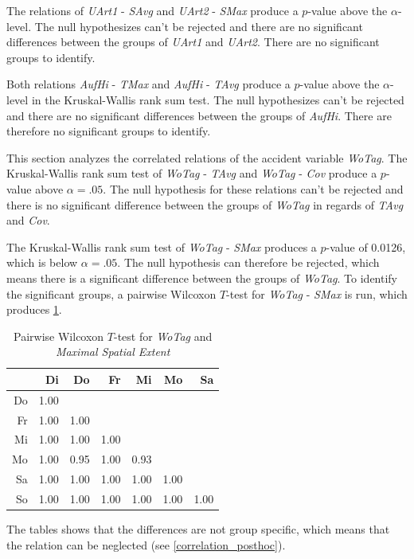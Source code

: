 The relations of \textit{UArt1} - \textit{SAvg} and \textit{UArt2} - \textit{SMax} produce a $p$-value above the $\alpha$-level. The null hypothesizes can't be rejected and there are no significant differences between the groups of \textit{UArt1} and \textit{UArt2}. There are no significant groups to identify.

Both relations \textit{AufHi} - \textit{TMax} and \textit{AufHi} - \textit{TAvg} produce a $p$-value above the $\alpha$-level in the Kruskal-Wallis rank sum test. The null hypothesizes can't be rejected and there are no significant differences between the groups of \textit{AufHi}. There are therefore no significant groups to identify.

This section analyzes the correlated relations of the accident variable \textit{WoTag}. The Kruskal-Wallis rank sum test of \textit{WoTag} - \textit{TAvg} and \textit{WoTag} - \textit{Cov} produce a $p$-value above $\alpha=.05$. The null hypothesis for these relations can't be rejected and there is no significant difference between the groups of \textit{WoTag} in regards of \textit{TAvg} and \textit{Cov}.

The Kruskal-Wallis rank sum test of \textit{WoTag} - \textit{SMax} produces a $p$-value of 0.0126, which is below $\alpha=.05$. The null hypothesis can therefore be rejected, which means there is a significant difference between the groups of \textit{WoTag}. To identify the significant groups, a pairwise Wilcoxon $T$-test for \textit{WoTag} - \textit{SMax} is run, which produces \cref{tbl:wilcoxon_baysis_effector_WoTag_TMax}. 
\begin{table}[ht!]
	\tiny
	\centering
	\begin{tabular}{rrrrrrr}
		\toprule
		   & Di & Do & Fr & Mi & Mo & Sa \\ 
		\midrule
		Do & 1.00 &  &  &  &  &  \\ 
		Fr & 1.00 & 1.00 &  &  &  &  \\ 
		Mi & 1.00 & 1.00 & 1.00 &  &  &  \\ 
		Mo & 1.00 & 0.95 & 1.00 & 0.93 &  &  \\ 
		Sa & 1.00 & 1.00 & 1.00 & 1.00 & 1.00 &  \\ 
		So & 1.00 & 1.00 & 1.00 & 1.00 & 1.00 & 1.00 \\ 
		\bottomrule
	  \end{tabular}
    \caption{Pairwise Wilcoxon $T$-test for \textit{WoTag} and \textit{Maximal Spatial Extent}}
    \label{tbl:wilcoxon_baysis_effector_WoTag_TMax}
\end{table}
The tables shows that the differences are not group specific, which means that the relation can be neglected (see \cref{correlation_posthoc}).

